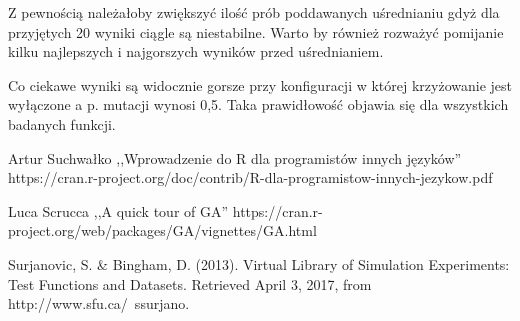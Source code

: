 \documentclass[11pt, a4paper]{article}
\newcommand{\fbi}{\leavevmode{\parindent=1em\indent}}
\begin{document}
\fbi
Z pewnością należałoby zwiększyć ilość prób poddawanych uśrednianiu gdyż dla przyjętych 20 wyniki ciągle są niestabilne. Warto by również rozważyć pomijanie kilku najlepszych i najgorszych wyników przed uśrednianiem.

\fbi
Co ciekawe wyniki są widocznie gorsze przy konfiguracji w której krzyżowanie jest wyłączone a p. mutacji wynosi 0,5. Taka prawidłowość objawia się dla wszystkich badanych funkcji.

\newpage
\begin{thebibliography}{40}

Artur Suchwałko ,,Wprowadzenie do R dla programistów innych języków'' https://cran.r-project.org/doc/contrib/R-dla-programistow-innych-jezykow.pdf

Luca Scrucca ,,A quick tour of GA''
https://cran.r-project.org/web/packages/GA/vignettes/GA.html

Surjanovic, S. \& Bingham, D. (2013). Virtual Library of Simulation Experiments: Test Functions and Datasets. Retrieved April 3, 2017, from http://www.sfu.ca/~ssurjano.

\end{thebibliography}
\end{document}
